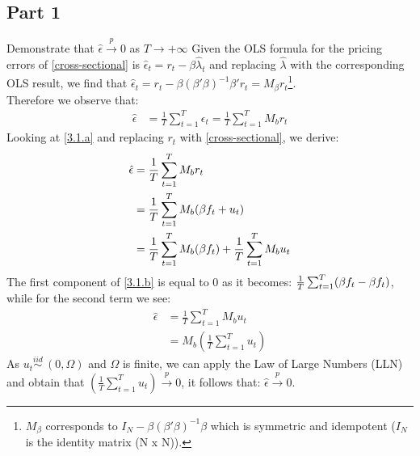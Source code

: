 \documentclass[12pt]{article}
\begin{document}
	\subsection{Part 1}
	Demonstrate that $\hat{\epsilon} \overset{p}{\to} 0$ as $T\to{+\infty}$ 
	Given the OLS formula for the pricing errors of \ref{cross-sectional} is $\hat{\epsilon}_t = r_t - \beta\hat{\lambda}_t$ and replacing $\hat{\lambda}$ with the corresponding OLS result, we find that $\hat{\epsilon}_t = r_t - \beta(\beta'\beta)^{-1}\beta'r_t = M_{\beta}r_t$\footnote{$M_{\beta}$ corresponds to $I_N - \beta(\beta'\beta)^{-1}\beta$ which is symmetric and idempotent ($I_N$ is the identity matrix (N x N)).}.\\
	Therefore we observe that:
	\begin{align} \label{3.1.a}
				\hat{\epsilon} &= \frac{1}{T}\sum_{t=1}^{T}\epsilon_t = \frac{1}{T}\sum_{t=1}^{T}M_br_t
	\end{align}
	Looking at \ref{3.1.a} and replacing $r_t$ with \ref{cross-sectional}, we derive:
\begin{align} \label{3.1.b}
				\hat{\epsilon} &=\frac{1}{T}\sum_{t=1}^{T}M_br_t \notag \\ \notag
				&= \frac{1}{T}\sum_{t=1}^{T}M_b(\MakeUppercase\beta f_t + u_t) \\ 
				&= \frac{1}{T}\sum_{t=1}^{T}M_b(\MakeUppercase\beta f_t) + \frac{1}{T}\sum_{t=1}^{T}M_bu_t
\end{align}
The first component of \ref{3.1.b} is equal to 0 as it becomes: $\frac{1}{T}\sum_{t=1}^{T}(\MakeUppercase\beta f_t-\MakeUppercase\beta f_t)$, while for the second term we see:
\begin{align*} 
				\hat{\epsilon} &=\frac{1}{T}\sum_{t=1}^{T}M_bu_t \\
				&= M_b(\frac{1}{T}\sum_{t=1}^{T}u_t)
\end{align*}
As $u_t \overset{iid}{\sim} \: (0,\Omega)$ and $\Omega$ is finite, we can apply the Law of Large Numbers (LLN) and obtain that $(\frac{1}{T}\sum_{t=1}^{T}u_t) \overset{p}{\to} 0$, it follows that: $\hat{\epsilon} \overset{p}{\to} 0$.
\end{document}
